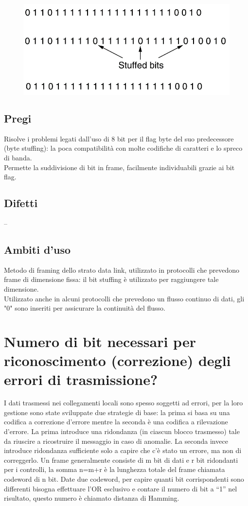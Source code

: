 \begin{figure}[H]
\centering
\includegraphics[scale=0.8]{res/img/14_BitStuffing.png}
\end{figure}

\subsection{Pregi}
Risolve i problemi legati dall'uso di 8 bit per il flag byte del suo predecessore (byte stuffing): la poca compatibilità con molte codifiche di caratteri e lo spreco di banda.\\
Permette la suddivisione di bit in frame, facilmente individuabili grazie ai bit flag.

\subsection{Difetti}
--
\subsection{Ambiti d'uso}
Metodo di framing dello strato data link, utilizzato in protocolli che prevedono frame di dimensione fissa: il bit stuffing è utilizzato per raggiungere tale dimensione.\\
Utilizzato anche in alcuni protocolli che prevedono un flusso continuo di dati, gli "0" sono inseriti per assicurare la continuità del flusso.

\section{Numero di bit necessari per riconoscimento (correzione) degli errori di trasmissione?}

I dati trasmessi nei collegamenti locali sono spesso soggetti ad errori, per la loro gestione sono state sviluppate due strategie di base:
la prima si basa su una codifica a correzione d'errore mentre la seconda è una codifica a rilevazione d'errore.
La prima introduce una ridondanza (in ciascun blocco trasmesso) tale da riuscire a ricostruire il messaggio in caso di anomalie.
La seconda invece introduce ridondanza sufficiente solo a capire che c'è stato un errore, ma non di correggerlo.
Un frame generalmente consiste di m bit di dati e r bit ridondanti per i controlli, la somma n=m+r è la lunghezza totale del frame chiamata codeword di n bit.
Date due codeword, per capire quanti bit corrispondenti sono differenti bisogna effettuare l'OR esclusivo e contare il numero di bit a “1” nel risultato,
questo numero è chiamato distanza di Hamming.
